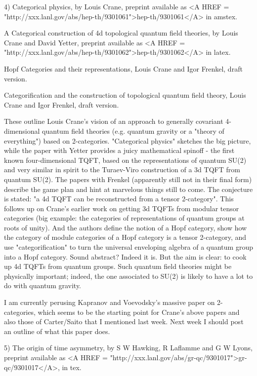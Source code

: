 4)  Categorical physics, by Louis Crane, preprint available as
<A HREF = "http://xxx.lanl.gov/abs/hep-th/9301061">hep-th/9301061</A> in amstex.

A Categorical construction of 4d topological quantum field theories,
by Louis Crane and David Yetter, preprint available as <A HREF = "http://xxx.lanl.gov/abs/hep-th/9301062">hep-th/9301062</A> in 
latex.

Hopf Categories and their representations, Louis Crane and Igor Frenkel,
draft version.

Categorification and the construction of topological quantum field theory,
Louis Crane and Igor Frenkel, draft version.


These outline Louis Crane's vision of an approach to generally covariant
4-dimensional quantum field theories (e.g. quantum gravity or a 
"theory of everything") based on 2-categories.  "Categorical physics"
sketches the big picture, while the paper with Yetter provides a
juicy mathematical spinoff - the first known four-dimensional
TQFT, based on the representations of quantum SU(2) and very similar
in spirit to the Turaev-Viro construction of a 3d TQFT from quantum
SU(2).  The papers with Frenkel (apparently still not in their
final form) describe the game plan and hint at marvelous things still to
come.  The conjecture is stated: "a 4d TQFT can be reconstructed from
a tensor 2-category".  This follows up on Crane's earlier work on
getting 3d TQFTs from modular tensor categories (big example: the
categories of representations of quantum groups at roots of unity).
And the authors define the notion of a Hopf category, show
how the category of module categories of a Hopf category is a
tensor 2-category, and use "categorification" to turn the universal
enveloping algebra of a quantum group into a Hopf category.  Sound
abstract?  Indeed it is.  But the aim is clear: to cook up 4d TQFTs
from quantum groups.  Such quantum field theories might be physically
important; indeed, the one associated to SU(2) is likely to have a lot
to do with quantum gravity.   

I am currently perusing Kapranov and Voevodsky's massive paper on 
2-categories, which seems to be the starting point for Crane's
above papers and also those of Carter/Saito that I mentioned last
week.  Next week I should post an outline of what this paper does.
 
5)  The origin of time asymmetry, by S W Hawking, R Laflamme and G W Lyons,
preprint available as <A HREF = "http://xxx.lanl.gov/abs/gr-qc/9301017">gr-qc/9301017</A>, in tex.

